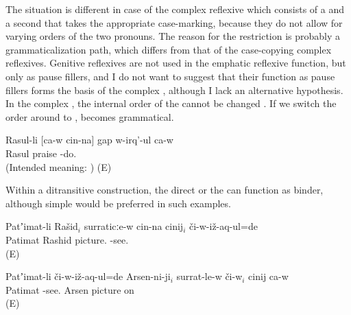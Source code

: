The situation is different in case of the complex  reflexive which consists of a   and a second  that takes the appropriate case-marking, because they do not allow for varying orders of the two pronouns. The reason for the restriction is probably a grammaticalization path, which differs from that of the case-copying complex reflexives. Genitive reflexives are not used in the emphatic reflexive function, but only as pause fillers, and I do not want to suggest that their function as pause fillers forms the basis of the complex , although I lack an alternative hypothesis. In the complex  , the internal order of the   cannot be changed . If we switch the order around to ,  becomes grammatical.
%
\begin{exe}
	\ex	\label{ex:Rasul is praising himself ungrammatical@29c}
	\gll	{*} 	Rasul-li [ca-w cin-na] gap w-irq'-ul	ca-w\\
		{}	Rasul			praise -do.	\\
	\glt	(Intended meaning: ) (E)
\end{exe}

Within a ditransitive construction, the direct  or the   can function as binder, although simple  would be preferred in such examples.
%
\begin{exe}

		\ex	\label{ex:Patimat showed Rashid to himself on the picture@12a}
		\gll	Patʼimat-li	Rašid$_{i}$	surraticːe-w	cin-na	cinij$_{i}$	či-w-iž-aq-ul=de\\
			Patimat	Rashid	picture.			-see.\\
		\glt	{} (E)

		\ex	\label{ex:Patimat showed to Arsen himself on the picture@12b}
		\gll	Patʼimat-li	či-w-iž-aq-ul=de	Arsen-ni-ji$_{i}$	surrat-le-w	či-w$_{i}$	cinij	ca-w\\
			Patimat	-see.	Arsen	picture	on		  \\
		\glt	{} (E)

\end{exe}

